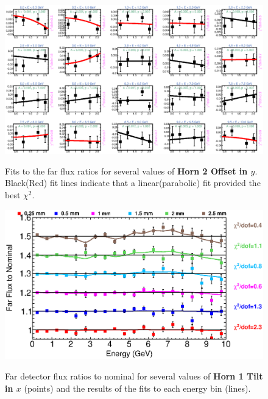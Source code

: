\begin{figure}[ht]
  \begin{center}
    {\includegraphics[width=5.0in]{figures/Horn2YOffset_far_fits.eps}}
  \end{center}
\caption{ Fits to the far flux ratios for several values of {\bf Horn 2 Offset in $y$}. Black(Red) fit lines indicate that a linear(parabolic) fit provided the best $\chi^2$. }
\end{figure}

\begin{figure}[ht]
  \begin{center}
    {\includegraphics[width=6.0in]{figures/Horn1XTilt_far_summary.eps}}
  \end{center}
\caption{ Far detector flux ratios to nominal for several values of {\bf Horn 1 Tilt in $x$} (points) and the results of the fits to each energy bin (lines).}
\end{figure}

